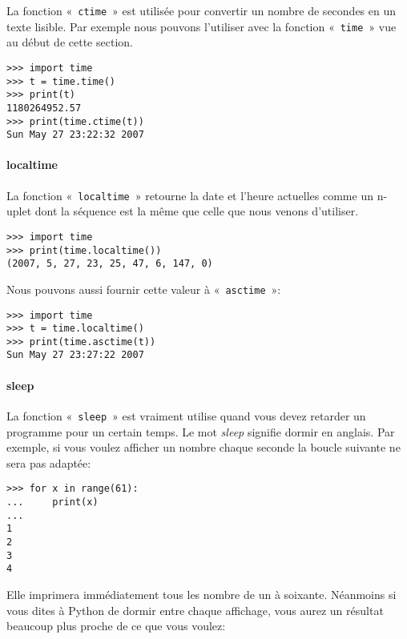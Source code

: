 La fonction «~\texttt{ctime}~» est utilisée pour convertir un nombre de secondes en un texte lisible.  Par exemple nous pouvons l'utiliser avec la fonction «~\texttt{time}~» vue au début de cette section.

\begin{Verbatim}[frame=single,rulecolor=\color{gray}]
>>> import time
>>> t = time.time()
>>> print(t)
1180264952.57
>>> print(time.ctime(t))
Sun May 27 23:22:32 2007
\end{Verbatim}


\paragraph{localtime}

La fonction «~\texttt{localtime}~» retourne la date et l'heure actuelles comme un n-uplet dont la séquence est la même que celle que nous venons d'utiliser. 

\begin{Verbatim}[frame=single,rulecolor=\color{gray}]
>>> import time
>>> print(time.localtime())
(2007, 5, 27, 23, 25, 47, 6, 147, 0)
\end{Verbatim}


Nous pouvons aussi fournir cette valeur à «~\texttt{asctime}~»:

\begin{Verbatim}[frame=single,rulecolor=\color{gray}]
>>> import time
>>> t = time.localtime()
>>> print(time.asctime(t))
Sun May 27 23:27:22 2007
\end{Verbatim}

\paragraph{sleep}

La fonction «~\texttt{sleep}~» est vraiment utilise quand vous devez retarder un programme pour un certain temps. Le mot \emph{sleep} signifie dormir en anglais. Par exemple, si vous voulez afficher un nombre chaque seconde la boucle suivante ne sera pas adaptée:

\begin{Verbatim}[frame=single,rulecolor=\color{gray}]
>>> for x in range(61):
...     print(x)
...
1
2
3
4
\end{Verbatim}

Elle imprimera immédiatement tous les nombre de un à soixante. Néanmoins si vous dites à Python de dormir entre chaque affichage, vous aurez un résultat beaucoup plus proche de ce que vous voulez:

